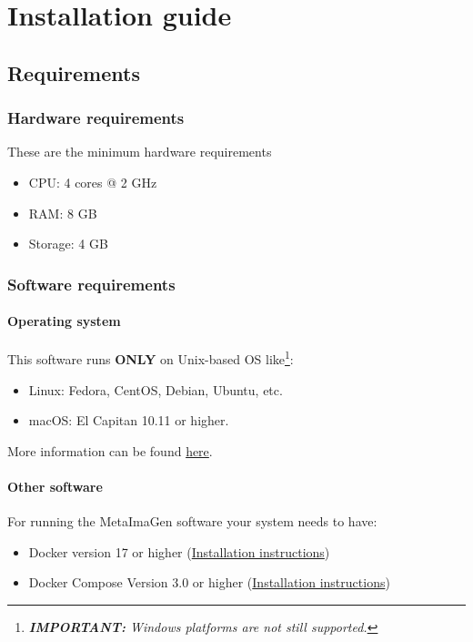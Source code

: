 \chapter{Installation guide}
\section{Requirements}
\subsection{Hardware requirements}
These are the minimum hardware requirements
\begin{itemize}
	\item CPU: 4 cores @ 2 GHz
	\item RAM: 8 GB
	\item Storage: 4 GB
\end{itemize}

\subsection{Software requirements}
\subsubsection{Operating system}
This software runs \textbf{ONLY} on Unix-based OS like\footnote[1]{\textit{\textbf{IMPORTANT: } Windows platforms are not still supported.}}:
\begin{itemize}
	\item Linux: Fedora, CentOS, Debian, Ubuntu, etc.
	\item macOS: El Capitan 10.11 or higher.
\end{itemize}

More information can be found \href{https://success.docker.com/article/compatibility-matrix}{here}.

\subsubsection{Other software}
For running the MetaImaGen software your system needs to have:
\begin{itemize}
	\item Docker version 17 or higher (\href{https://docs.docker.com/install/#supported-platforms}{Installation instructions})
	\item Docker Compose Version 3.0 or higher (\href{https://docs.docker.com/compose/install/}{Installation instructions})
\end{itemize}

